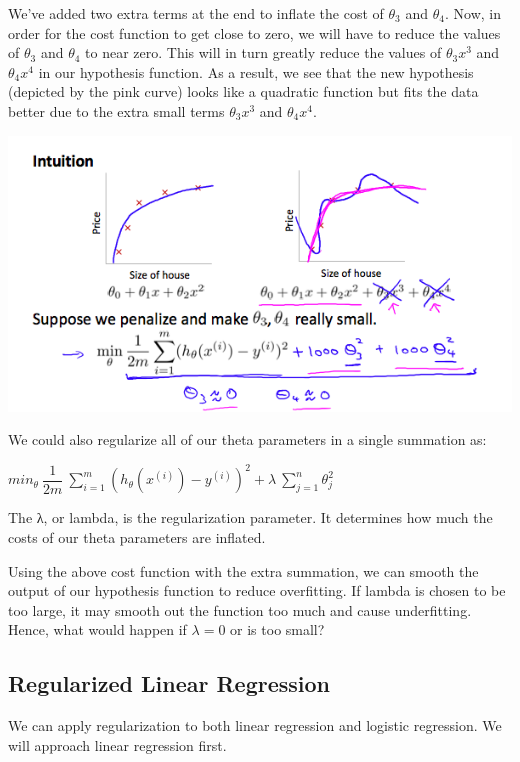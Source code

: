 \documentclass[
]{article}
\begin{document}
We've added two extra terms at the end to inflate the cost of
\(\theta_3\) and \(\theta_4\). Now, in order for the cost function to
get close to zero, we will have to reduce the values of \(\theta_3\) and
\(\theta_4\) to near zero. This will in turn greatly reduce the values
of \(\theta_3x^3\) and \(\theta_4x^4\) in our hypothesis function. As a
result, we see that the new hypothesis (depicted by the pink curve)
looks like a quadratic function but fits the data better due to the
extra small terms \(\theta_3x^3\) and \(\theta_4x^4\).

\includegraphics{RegCostFunc.png}

We could also regularize all of our theta parameters in a single
summation as:

\(min_\theta\ \dfrac{1}{2m}\ \sum_{i=1}^m (h_\theta(x^{(i)}) - y^{(i)})^2 + \lambda\ \sum_{j=1}^n \theta_j^2\)

The λ, or lambda, is the regularization parameter. It determines how
much the costs of our theta parameters are inflated.

Using the above cost function with the extra summation, we can smooth
the output of our hypothesis function to reduce overfitting. If lambda
is chosen to be too large, it may smooth out the function too much and
cause underfitting. Hence, what would happen if \(\lambda = 0\) or is
too small?

\hypertarget{regularized-linear-regression}{%
\subsection{Regularized Linear
Regression}\label{regularized-linear-regression}}

We can apply regularization to both linear regression and logistic
regression. We will approach linear regression first.
\end{document}
